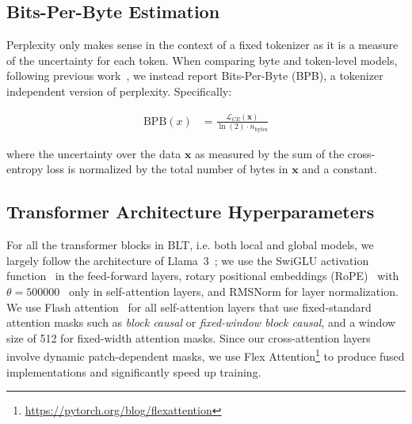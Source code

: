 \subsection{Bits-Per-Byte Estimation} Perplexity only makes sense in the context of a fixed tokenizer as it is a measure of the uncertainty for each token. When comparing byte and token-level models, following previous work~\citep{xue2022byt5, yu2023megabyte, wang2024mambabyte}, we instead report Bits-Per-Byte (BPB), a tokenizer independent version of perplexity. Specifically:

\begin{align}
    \text{BPB}(x)&= \frac{\mathcal{L}_{CE}(\pmb{x})}{\ln(2)\cdot n_{\text{bytes}}}
\end{align}

where the uncertainty over the data $\pmb{x}$ as measured by the sum of the cross-entropy loss is normalized by the total number of bytes in $\pmb{x}$ and a constant. 

\subsection{Transformer Architecture Hyperparameters} For all the transformer blocks in {\textsc BLT}, i.e. both local and global models, we largely follow the architecture of Llama~3~\citep{dubey2024llama}; we use the SwiGLU activation function~\citep{swiglu} in the feed-forward layers, rotary positional embeddings (RoPE)~\citep{RoPe} with $\theta=500000$~\citep{xiong2024effective} only in self-attention layers, and RMSNorm \citep{RMSNorm} for layer normalization. We use Flash attention~\citep{dao2022flashattention} for all self-attention layers that use fixed-standard attention masks such as \textit{block causal} or \textit{fixed-window block causal}, and a window size of 512 for fixed-width attention masks. Since our cross-attention layers involve dynamic patch-dependent masks, we use Flex Attention\footnote{\url{https://pytorch.org/blog/flexattention}} to produce fused implementations and significantly speed up training.

